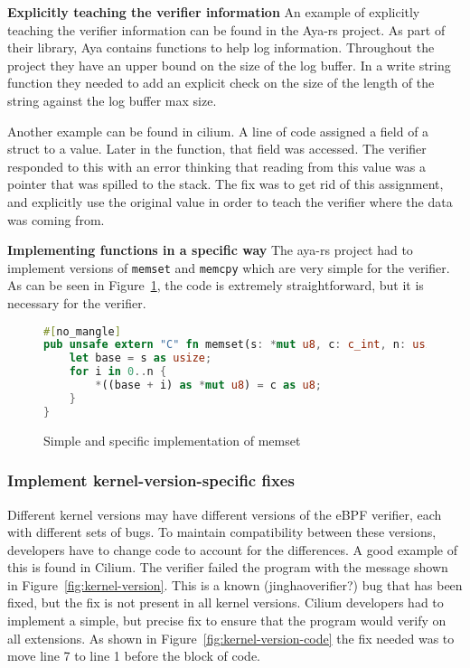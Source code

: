 \noindent\textbf{Explicitly teaching the verifier information}
An example of explicitly teaching the verifier information can be found in the Aya-rs project.
As part of their library, Aya contains functions to help log information.
Throughout the project they have an upper bound on the size of the log buffer.
In a write string function they needed to add an explicit check on the size of the length of the string against the log buffer max size.

Another example can be found in cilium.
A line of code assigned a field of a struct to a value.
Later in the function, that field was accessed.
The verifier responded to this with an error thinking that reading from this value was a pointer that was spilled to the stack.
The fix was to get rid of this assignment, and explicitly use the original value in order to teach the verifier where the data was coming from.

\noindent\textbf{Implementing functions in a specific way}
The aya-rs project had to implement versions of \texttt{memset} and \texttt{memcpy} which are very simple for the verifier.
As can be seen in Figure~\ref{fig:aya-memset}, the code is extremely straightforward, but it is necessary for the verifier.

\begin{figure}
    \begin{lstlisting}[language=rust]
#[no_mangle]
pub unsafe extern "C" fn memset(s: *mut u8, c: c_int, n: usize) {
    let base = s as usize;
    for i in 0..n {
        *((base + i) as *mut u8) = c as u8;
    }
}
    \end{lstlisting}
    \caption{Simple and specific implementation of memset}
    \label{fig:aya-memset}
\end{figure}

\subsubsection{Implement kernel-version-specific fixes}
Different kernel versions may have different versions of the eBPF verifier, each with different sets of bugs.
To maintain compatibility between these versions, developers have to change code to account for the differences.
A good example of this is found in Cilium.
The verifier failed the program with the message shown in Figure~\ref{fig:kernel-version}.
This is a known (jinghao{verifier?}) bug that has been fixed, but the fix is not present in all kernel versions.
Cilium developers had to implement a simple, but precise fix to ensure that the program would verify on all extensions.
As shown in Figure~\ref{fig:kernel-version-code} the fix needed was to move line 7 to line 1 before the block of code.

